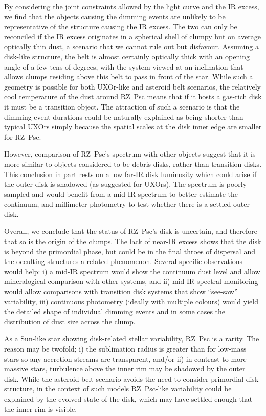 \documentclass[useAMS,usenatbib,usegraphicx]{mn2e}
\begin{document}
By considering the joint constraints allowed by the light curve and the IR excess, we
find that the objects causing the dimming events are unlikely to be representative of the
structure causing the IR excess. The two can only be reconciled if the IR excess
originates in a spherical shell of clumpy but on average optically thin dust, a scenario
that we cannot rule out but disfavour. Assuming a disk-like structure, the belt is almost
certainly optically thick with an opening angle of a few tens of degrees, with the system
viewed at an inclination that allows clumps residing above this belt to pass in front of
the star. While such a geometry is possible for both UXOr-like and asteroid belt
scenarios, the relatively cool temperature of the dust around RZ~Psc means that if it
hosts a gas-rich disk it must be a transition object. The attraction of such a scenario
is that the dimming event durations could be naturally explained as being shorter than
typical UXOrs simply because the spatial scales at the disk inner edge are smaller for
RZ~Psc.

However, comparison of RZ~Psc's spectrum with other objects suggest that it is more
similar to objects considered to be debris disks, rather than transition disks. This
conclusion in part rests on a low far-IR disk luminosity which could arise if the outer
disk is shadowed (as suggested for UXOrs). The spectrum is poorly sampled and would
benefit from a mid-IR spectrum to better estimate the continuum, and millimeter
photometry to test whether there is a settled outer disk.

Overall, we conclude that the status of RZ~Psc's disk is uncertain, and therefore that so
is the origin of the clumps. The lack of near-IR excess shows that the disk is beyond the
primordial phase, but could be in the final throes of dispersal and the occulting
structures a related phenomenon. Several specific observations would help: i) a mid-IR
spectrum would show the continuum dust level and allow mineralogical comparison with
other systems, and ii) mid-IR spectral monitoring would allow comparisons with transition
disk systems that show ``see-saw'' variability, iii) continuous photometry (ideally with
multiple colours) would yield the detailed shape of individual dimming events and in some
cases the distribution of dust size across the clump.

As a Sun-like star showing disk-related stellar variability, RZ~Psc is a rarity. The
reason may be twofold; i) the sublimation radius is greater than for low-mass stars so
any accretion streams are transparent, and/or ii) in contrast to more massive stars,
turbulence above the inner rim may be shadowed by the outer disk. While the asteroid belt
scenario avoids the need to consider primordial disk structure, in the context of such
models RZ~Psc-like variability could be explained by the evolved state of the disk, which
may have settled enough that the inner rim is visible.
\end{document}
